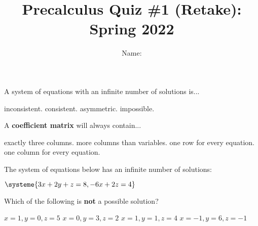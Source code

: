 \documentclass{exam}
\title{Precalculus Quiz \#1 (Retake): Spring 2022  }
\author{  Name:   }
\begin{document}
\maketitle
\thispagestyle{empty}

\begin{questions}
\question 

\begin{multicols}{2}
A system of equations with an infinite number of solutions is... 

\columnbreak
\begin{choices}
\choice inconsistent.
\choice consistent.
\choice asymmetric.
\choice impossible.
\end{choices}

\end{multicols}



\question
\begin{multicols}{2}
A \textbf{coefficient matrix} will always contain...

\columnbreak

\begin{choices}
\choice exactly three columns.
\choice  more columns than variables.
\choice one row for every equation.
\choice  one column for every equation.
\end{choices}
\end{multicols}


\question
\begin{multicols}{2}
The system of equations below has an infinite number of solutions:

$
\systeme{
3x + 2y + z = 8,
-6x + 2z = 4
}
$

Which of the following is \textbf{not} a possible solution?

\columnbreak

\begin{choices}
\choice $x=1, y=0,z=5$
\choice $ x=0, y=3, z=2$
\choice $x=1,y=1,z=4$
\choice$ x=-1,y=6,z=-1$
\end{choices}
\end{multicols}
\question 
\label{two}

\end{questions}
\end{document}
